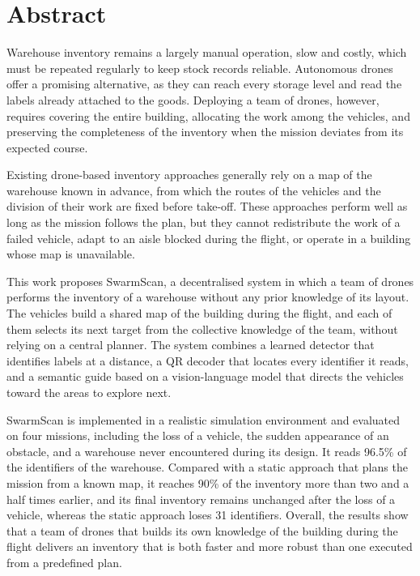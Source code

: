 \singlespacing
\titlespacing*{\chapter}{0pt}{0pt}{20pt}

\chapter*{Abstract}

Warehouse inventory remains a largely manual operation, slow and costly, which
must be repeated regularly to keep stock records reliable. Autonomous drones
offer a promising alternative, as they can reach every storage level and read the
labels already attached to the goods. Deploying a team of drones, however,
requires covering the entire building, allocating the work among the vehicles,
and preserving the completeness of the inventory when the mission deviates from
its expected course.

Existing drone-based inventory approaches generally rely on a map of the
warehouse known in advance, from which the routes of the vehicles and the
division of their work are fixed before take-off. These approaches perform well
as long as the mission follows the plan, but they cannot redistribute the work of
a failed vehicle, adapt to an aisle blocked during the flight, or operate in a
building whose map is unavailable.

This work proposes SwarmScan, a decentralised system in which a team of drones
performs the inventory of a warehouse without any prior knowledge of its layout.
The vehicles build a shared map of the building during the flight, and each of
them selects its next target from the collective knowledge of the team, without
relying on a central planner. The system combines a learned detector that
identifies labels at a distance, a QR decoder that locates every identifier it
reads, and a semantic guide based on a vision-language model that directs the
vehicles toward the areas to explore next.

SwarmScan is implemented in a realistic simulation environment and evaluated on
four missions, including the loss of a vehicle, the sudden appearance of an
obstacle, and a warehouse never encountered during its design. It reads 96.5\% of
the identifiers of the warehouse. Compared with a static approach that plans the
mission from a known map, it reaches 90\% of the inventory more than two and a
half times earlier, and its final inventory remains unchanged after the loss of a
vehicle, whereas the static approach loses 31 identifiers. Overall, the results
show that a team of drones that builds its own knowledge of the building during
the flight delivers an inventory that is both faster and more robust than one
executed from a predefined plan.

